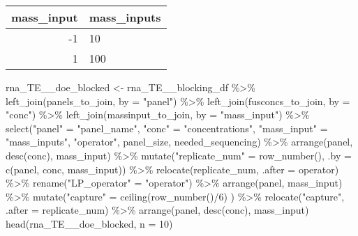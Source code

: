 \documentclass[
]{article}
\newenvironment{Shaded}{\begin{snugshade}}{\end{snugshade}}
\newcommand{\AttributeTok}[1]{\textcolor[rgb]{0.77,0.63,0.00}{#1}}
\newcommand{\DecValTok}[1]{\textcolor[rgb]{0.00,0.00,0.81}{#1}}
\newcommand{\FunctionTok}[1]{\textcolor[rgb]{0.00,0.00,0.00}{#1}}
\newcommand{\NormalTok}[1]{#1}
\newcommand{\OtherTok}[1]{\textcolor[rgb]{0.56,0.35,0.01}{#1}}
\newcommand{\SpecialCharTok}[1]{\textcolor[rgb]{0.00,0.00,0.00}{#1}}
\newcommand{\StringTok}[1]{\textcolor[rgb]{0.31,0.60,0.02}{#1}}
\begin{document}
\begin{longtable}[]{@{}rl@{}}
\toprule()
mass\_input & mass\_inputs \\
\midrule()
\endhead
-1 & 10 \\
1 & 100 \\
\bottomrule()
\end{longtable}

\begin{Shaded}
\begin{Highlighting}[]
\NormalTok{rna\_TE\_\_doe\_blocked }\OtherTok{\textless{}{-}}\NormalTok{ rna\_TE\_\_blocking\_df }\SpecialCharTok{\%\textgreater{}\%}
  \FunctionTok{left\_join}\NormalTok{(panels\_to\_join, }\AttributeTok{by =} \StringTok{"panel"}\NormalTok{) }\SpecialCharTok{\%\textgreater{}\%}
  \FunctionTok{left\_join}\NormalTok{(fusconcs\_to\_join, }\AttributeTok{by =} \StringTok{"conc"}\NormalTok{) }\SpecialCharTok{\%\textgreater{}\%}
  \FunctionTok{left\_join}\NormalTok{(massinput\_to\_join, }\AttributeTok{by =} \StringTok{"mass\_input"}\NormalTok{) }\SpecialCharTok{\%\textgreater{}\%}
  \FunctionTok{select}\NormalTok{(}\StringTok{"panel"} \OtherTok{=} \StringTok{"panel\_name"}\NormalTok{, }\StringTok{"conc"} \OtherTok{=} \StringTok{"concentrations"}\NormalTok{,}
         \StringTok{"mass\_input"} \OtherTok{=} \StringTok{"mass\_inputs"}\NormalTok{, }\StringTok{"operator"}\NormalTok{, panel\_size, needed\_sequencing) }\SpecialCharTok{\%\textgreater{}\%}
  \FunctionTok{arrange}\NormalTok{(panel, }\FunctionTok{desc}\NormalTok{(conc), mass\_input) }\SpecialCharTok{\%\textgreater{}\%}
  \FunctionTok{mutate}\NormalTok{(}\StringTok{"replicate\_num"} \OtherTok{=} \FunctionTok{row\_number}\NormalTok{(), }\AttributeTok{.by =} \FunctionTok{c}\NormalTok{(panel, conc, mass\_input)) }\SpecialCharTok{\%\textgreater{}\%}
  \FunctionTok{relocate}\NormalTok{(replicate\_num, }\AttributeTok{.after =}\NormalTok{ operator) }\SpecialCharTok{\%\textgreater{}\%}
  \FunctionTok{rename}\NormalTok{(}\StringTok{"LP\_operator"} \OtherTok{=} \StringTok{"operator"}\NormalTok{) }\SpecialCharTok{\%\textgreater{}\%}
  \FunctionTok{arrange}\NormalTok{(panel, mass\_input) }\SpecialCharTok{\%\textgreater{}\%}
  \FunctionTok{mutate}\NormalTok{(}\StringTok{"capture"} \OtherTok{=} \FunctionTok{ceiling}\NormalTok{(}\FunctionTok{row\_number}\NormalTok{()}\SpecialCharTok{/}\DecValTok{6}\NormalTok{) ) }\SpecialCharTok{\%\textgreater{}\%}
  \FunctionTok{relocate}\NormalTok{(}\StringTok{"capture"}\NormalTok{, }\AttributeTok{.after =}\NormalTok{ replicate\_num) }\SpecialCharTok{\%\textgreater{}\%}
  \FunctionTok{arrange}\NormalTok{(panel, }\FunctionTok{desc}\NormalTok{(conc), mass\_input)}
\FunctionTok{head}\NormalTok{(rna\_TE\_\_doe\_blocked, }\AttributeTok{n =} \DecValTok{10}\NormalTok{)}
\end{Highlighting}
\end{Shaded}
\end{document}
